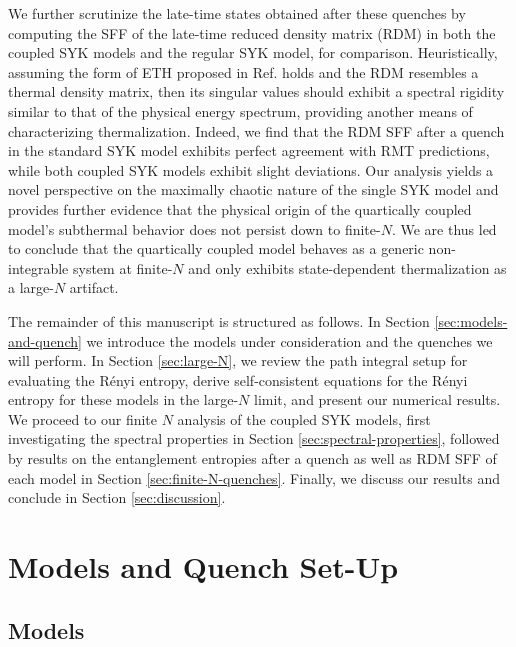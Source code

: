 \documentclass[reprint, floatfix,eqsecnum,superscriptaddress,preprint,nofootinbib,onecolumn,amsmath,amssymb,aps,prb]{revtex4-2}
\newcommand{\xiaoqi}[1]{\textcolor{violet}{(XS: #1)}}
\begin{document}
We further scrutinize the late-time states obtained after these quenches by computing the SFF of the late-time reduced density matrix (RDM) \cite{Chen2018,Chang2019} in both the coupled SYK models and the regular SYK model, for comparison. 
Heuristically, assuming the form of ETH proposed in Ref. \cite{Garrison2018} holds and the RDM resembles a thermal density matrix, then its singular values should exhibit a spectral rigidity similar to that of the physical energy spectrum,
providing another means of characterizing thermalization.
Indeed, we find that the RDM SFF after a quench in the standard SYK model exhibits perfect agreement with RMT predictions, while both coupled SYK models exhibit slight deviations. Our analysis yields a novel perspective on the maximally chaotic nature of the single SYK model and provides further evidence that the physical origin of the quartically coupled model's subthermal behavior does not persist down to finite-$N$. We are thus led to conclude that the quartically coupled model behaves as a generic non-integrable system at finite-$N$ and only exhibits state-dependent thermalization as a large-$N$ artifact. 

The remainder of this manuscript is structured as follows. In Section \ref{sec:models-and-quench} we introduce the models under consideration and the quenches we will perform. In Section \ref{sec:large-N}, 
we review the path integral setup for evaluating the R\'enyi entropy, derive self-consistent equations for the R\'enyi entropy for these models in the large-$N$ limit, and present our numerical results.  
We proceed to our finite $N$ analysis of the coupled SYK models, first investigating the spectral properties in Section \ref{sec:spectral-properties}, followed by results on the entanglement entropies after a quench as well as RDM SFF of each model in Section \ref{sec:finite-N-quenches}.
Finally, we discuss our results and conclude in Section \ref{sec:discussion}.

\section{Models and Quench Set-Up \label{sec:models-and-quench} }

\subsection{Models}
\end{document}

